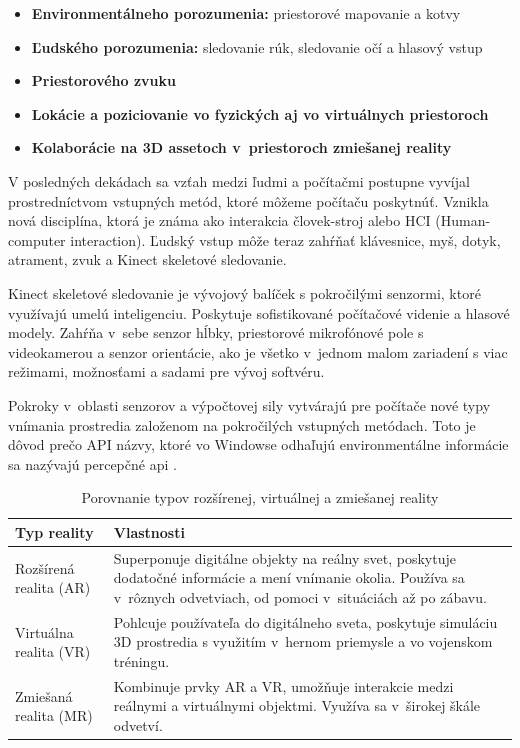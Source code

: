 \begin{itemize}
    \item \textbf{Environmentálneho porozumenia:} priestorové mapovanie a kotvy
    \item \textbf{Ľudského porozumenia:} sledovanie rúk, sledovanie očí a hlasový vstup
    \item \textbf{Priestorového zvuku}
    \item \textbf{Lokácie a poziciovanie vo fyzických aj vo virtuálnych priestoroch}
    \item \textbf{Kolaborácie na 3D assetoch v~priestoroch zmiešanej reality}
\end{itemize}

V posledných dekádach sa vzťah medzi ľudmi a počítačmi postupne vyvíjal prostredníctvom vstupných metód, ktoré môžeme počítaču poskytnúť. Vznikla nová disciplína, ktorá je známa ako interakcia človek-stroj alebo HCI (Human-computer interaction). Ľudský vstup môže teraz zahŕňať klávesnice, myš, dotyk, atrament, zvuk a Kinect skeletové sledovanie.

Kinect skeletové sledovanie je vývojový balíček s pokročilými senzormi, ktoré využívajú umelú inteligenciu. Poskytuje sofistikované počítačové videnie a hlasové modely. Zahŕňa v~sebe senzor hĺbky, priestorové mikrofónové pole s videokamerou a senzor orientácie, ako je všetko v~jednom malom zariadení s viac režimami, možnosťami a sadami pre vývoj softvéru. 

Pokroky v~oblasti senzorov a výpočtovej sily vytvárajú pre počítače nové typy vnímania prostredia založenom na pokročilých vstupných metódach. Toto je dôvod prečo API názvy, ktoré vo Windowse odhaľujú environmentálne informácie sa nazývajú percepčné \gls{api} \cite{microsoft2023mixedreality}.

\begin{table}[h]
\centering
\begin{tabular}{|l|p{7cm}|}
\hline
\textbf{Typ reality}       & \textbf{Vlastnosti}                                                                                                                                                                                                                             \\ \hline
Rozšírená realita (AR)     & Superponuje digitálne objekty na reálny svet, poskytuje dodatočné informácie a mení vnímanie okolia. Používa sa v~rôznych odvetviach, od pomoci v~situáciách až po zábavu. \\ \hline
Virtuálna realita (VR)     & Pohlcuje používateľa do digitálneho sveta, poskytuje simuláciu 3D prostredia s využitím v~hernom priemysle a vo vojenskom tréningu.           \\ \hline
Zmiešaná realita (MR)      & Kombinuje prvky AR a VR, umožňuje interakcie medzi reálnymi a virtuálnymi objektmi. Využíva sa v~širokej škále odvetví.           \\ \hline
\end{tabular}
\caption{Porovnanie typov rozšírenej, virtuálnej a zmiešanej reality}
\label{tab:porovnanie_realit}
\end{table}

